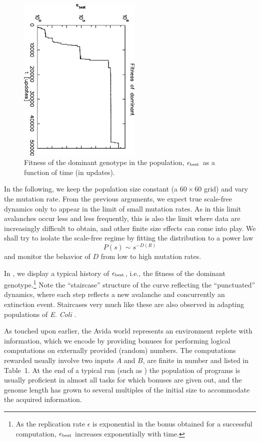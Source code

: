 \documentclass[letterpaper]{article}
\begin{document}
\begin{figure}[ht]
    \centering
    \includegraphics[width=2.3in, angle=90]{fig2.eps}
    \caption{
        Fitness of the dominant genotype in the population, $\epsilon_{\rm best}$ as a function of time (in updates).
    }
    \label{fig2}
\end{figure}

In the following, we keep the population size constant (a $60\times60$
grid) and vary the mutation rate. From the previous arguments, we
expect true scale-free dynamics only to appear in the limit of small
mutation rates.  As in this limit avalanches occur less and less
frequently, this is also the limit where data are increasingly
difficult to obtain, and other finite size effects can come into play.
We shall try to isolate the scale-free regime by fitting the
distribution to a power law
\begin{equation}
    P(s)\sim s^{-D(R)}\label{power}
\end{equation}
and monitor the behavior of $D$ from low to high mutation rates.

In , we display a typical history of $\epsilon_{\rm
best}$, i.e., the fitness of the dominant genotype.\footnote{As the
replication rate $\epsilon$ is exponential in the bonus obtained for a
successful computation, $\epsilon_{\rm best}$ increases exponentially
with time.}  Note the ``staircase'' structure of the curve reflecting
the ``punctuated'' dynamics, where each step reflects a new avalanche
and concurrently an extinction event. Staircases very much like these
are also observed in adapting populations of {\it E. Coli}
\citep{LT94}.

As touched upon earlier, the Avida world represents an environment
replete with information, which we encode by providing bonuses for
performing logical computations on externally provided (random)
numbers. The computations rewarded usually involve two inputs $A$ and
$B$, are finite in number and listed in Table~1. At the end of a
typical run (such as ) the population of programs is
usually proficient in almost all tasks for which bonuses are given
out, and the genome length has grown to several multiples of the
initial size to accommodate the acquired information.
\end{document}
